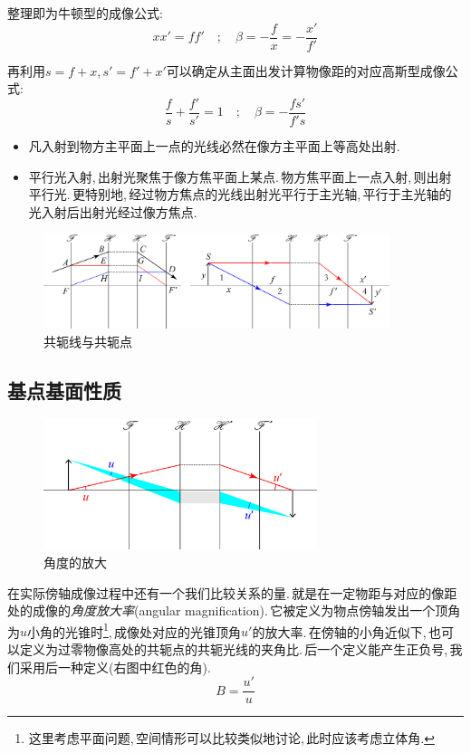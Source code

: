 整理即为牛顿型的成像公式:
\[xx'=ff'\quad ;\quad \beta=-\frac{f}{x}=-\frac{x'}{f'}\]

再利用\(s=f+x\),\,\(s'=f'+x'\)可以确定从主面出发计算物像距的对应高斯型成像公式:
\[\frac{f}{s}+\frac{f'}{s'}=1\quad ;\quad \beta=-\frac{fs'}{f's}\]
\begin{itemize}
	\item 凡入射到物方主平面上一点的光线必然在像方主平面上等高处出射.
	\item 平行光入射,\,出射光聚焦于像方焦平面上某点.\,物方焦平面上一点入射,\,则出射平行光.\,更特别地,\,经过物方焦点的光线出射光平行于主光轴,\,平行于主光轴的光入射后出射光经过像方焦点.
\end{itemize}
\begin{figure}[H]
\centering
\includegraphics[width=0.9\textwidth]{image/5-7-8.png}
\caption{共轭线与共轭点}
\end{figure}

\subsection{基点基面性质}
\begin{figure}
\centering
\vspace{0cm}
\includegraphics[width=8cm]{image/5-7-9.png}
\caption{角度的放大}
\end{figure}
在实际傍轴成像过程中还有一个我们比较关系的量.\,就是在一定物距与对应的像距处的成像的\emph{角度放大率}(angular magnification).\,它被定义为物点傍轴发出一个顶角为\(u\)小角的光锥时\footnote{这里考虑平面问题,\,空间情形可以比较类似地讨论,\,此时应该考虑立体角.},\,成像处对应的光锥顶角\(u'\)的放大率.\,在傍轴的小角近似下,\,也可以定义为过零物像高处的共轭点的共轭光线的夹角比.\,后一个定义能产生正负号,\,我们采用后一种定义(右图中红色的角).
\[B=\frac{u'}{u}\]

